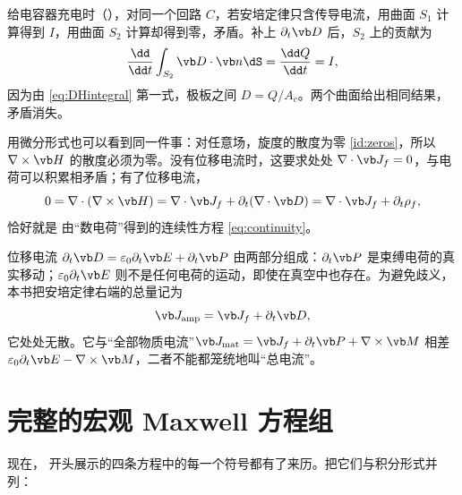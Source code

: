 
给电容器充电时（），对同一个回路 $C$，若安培定律只含传导电流，用曲面 $S_1$ 计算得到 $I$，用曲面 $S_2$ 计算却得到零，矛盾。补上 $\partial_t\vb D$ 后，$S_2$ 上的贡献为
\begin{equation}
\frac{\dd}{\dd t}\int_{S_2}\vb D\cdot\vb n\dS=\frac{\dd Q}{\dd t}=I ,
\end{equation}
因为由 \eqref{eq:DHintegral} 第一式，极板之间 $D=Q/A_c$。两个曲面给出相同结果，矛盾消失。

用微分形式也可以看到同一件事：对任意场，旋度的散度为零 \eqref{id:zeros}，所以 $\nabla\times\vb H$ 的散度必须为零。没有位移电流时，这要求处处 $\nabla\cdot\vb J_f=0$，与电荷可以积累相矛盾；有了位移电流，
\begin{equation}
0=\nabla\cdot(\nabla\times\vb H)=\nabla\cdot\vb J_f+\partial_t(\nabla\cdot\vb D)=\nabla\cdot\vb J_f+\partial_t\rho_f,
\label{eq:continuityfromampere}
\end{equation}
恰好就是 由“数电荷”得到的连续性方程 \eqref{eq:continuity}。

位移电流 $\partial_t\vb D=\varepsilon_0\partial_t\vb E+\partial_t\vb P$ 由两部分组成：$\partial_t\vb P$ 是束缚电荷的真实移动；$\varepsilon_0\partial_t\vb E$ 则不是任何电荷的运动，即使在真空中也存在。为避免歧义，本书把安培定律右端的总量记为
\begin{equation}
\vb J_{\rm amp}=\vb J_f+\partial_t\vb D ,
\end{equation}
它处处无散。它与“全部物质电流”$\vb J_{\rm mat}=\vb J_f+\partial_t\vb P+\nabla\times\vb M$ 相差 $\varepsilon_0\partial_t\vb E-\nabla\times\vb M$，二者不能都笼统地叫“总电流”。

\section{完整的宏观 Maxwell 方程组}\label{sec:matter-maxwell}

现在， 开头展示的四条方程中的每一个符号都有了来历。把它们与积分形式并列：

